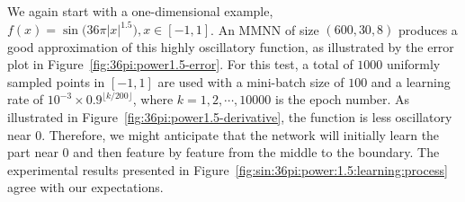\documentclass[review,hidelinks,onefignum,onetabnum]{siamart250211}
\begin{document}
We again start with a one-dimensional example, $f(x)=\sin\big(36\pi |x|^{1.5}\big), x\in[-1,1]$. 
An MMNN of size $(600,30,8)$ produces a good approximation of this highly oscillatory function, as illustrated by the error plot in Figure~\ref{fig:36pi:power1.5-error}. For this test, a total of $1000$ uniformly sampled points in $[-1,1]$ are used with a mini-batch size of $100$ and a learning rate of $10^{-3}\times 0.9^{\lfloor k/200 \rfloor}$, where $k=1,2,\cdots,10000$ is the epoch number. 
As illustrated in Figure~\ref{fig:36pi:power1.5-derivative}, the function is less oscillatory near 0. Therefore, we might anticipate that the network will initially learn the part near 0 and then feature by feature from the middle to the boundary. The experimental results presented in Figure~\ref{fig:sin:36pi:power:1.5:learning:process} agree with our expectations.



\end{document}
